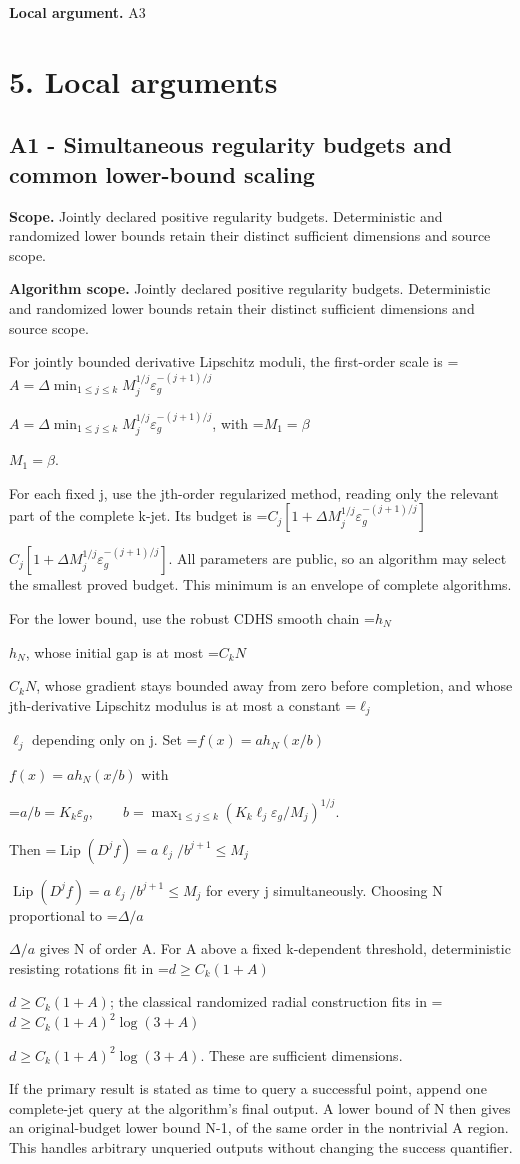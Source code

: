 \documentclass[10pt,a4paper]{article}
\newcommand{\AtlasMath}[1]{\par\begingroup\centering\setbox0=\hbox{$\displaystyle #1$}\ifdim\wd0>1.4\linewidth\typeout{ATLAS WIDE FORMULA: \the\wd0}\fi\ifdim\wd0>\linewidth\resizebox{\linewidth}{!}{\box0}\else\box0\fi\par\endgroup}
\newcommand{\AtlasInlineMath}[1]{\begingroup\setbox0=\hbox{$#1$}\ifdim\wd0>.4\linewidth\endgroup\AtlasMath{#1}\else\endgroup$#1$\fi}
\begin{document}
\textbf{Local argument.} A3

\section{5. Local arguments}
\subsection{A1 - Simultaneous regularity budgets and common lower-bound scaling}
\textbf{Scope.} Jointly declared positive regularity budgets. Deterministic and randomized lower bounds retain their distinct sufficient dimensions and source scope.

\textbf{Algorithm scope.} Jointly declared positive regularity budgets. Deterministic and randomized lower bounds retain their distinct sufficient dimensions and source scope.

For jointly bounded derivative Lipschitz moduli, the first-order scale is \AtlasInlineMath{A=\Delta\min_{1\le j\le k}M_j^{1/j}\varepsilon_g^{-(j+1)/j}}, with \AtlasInlineMath{M_1=\beta}.

For each fixed j, use the jth-order regularized method, reading only the relevant part of the complete k-jet. Its budget is \AtlasInlineMath{C_j[1+\Delta M_j^{1/j}\varepsilon_g^{-(j+1)/j}]}. All parameters are public, so an algorithm may select the smallest proved budget. This minimum is an envelope of complete algorithms.

For the lower bound, use the robust CDHS smooth chain \AtlasInlineMath{h_N}, whose initial gap is at most \AtlasInlineMath{C_kN}, whose gradient stays bounded away from zero before completion, and whose jth-derivative Lipschitz modulus is at most a constant \AtlasInlineMath{\ell_j} depending only on j. Set \AtlasInlineMath{f(x)=a h_N(x/b)} with

\AtlasMath{a/b=K_k\varepsilon_g,\qquad
b=\max_{1\le j\le k}(K_k\ell_j\varepsilon_g/M_j)^{1/j}.}

Then \AtlasInlineMath{\operatorname{Lip}(D^jf)=a\ell_j/b^{j+1}\le M_j} for every j simultaneously. Choosing N proportional to \AtlasInlineMath{\Delta/a} gives N of order A. For A above a fixed k-dependent threshold, deterministic resisting rotations fit in \AtlasInlineMath{d\ge C_k(1+A)}; the classical randomized radial construction fits in \AtlasInlineMath{d\ge C_k(1+A)^2\log(3+A)}. These are sufficient dimensions.

If the primary result is stated as time to query a successful point, append one complete-jet query at the algorithm's final output. A lower bound of N then gives an original-budget lower bound N-1, of the same order in the nontrivial A region. This handles arbitrary unqueried outputs without changing the success quantifier.
\end{document}
